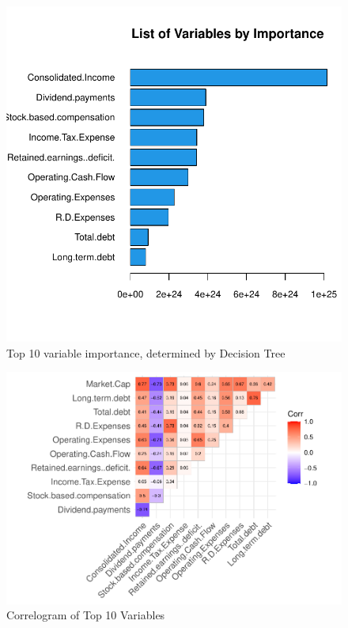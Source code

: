 \documentclass[11pt,]{article}
\begin{document}
\begin{figure}

{\centering \includegraphics{stock_analysis_files/figure-latex/variable importance-1} 

}

\caption{Top 10 variable importance, determined by Decision Tree}\label{fig:variable importance}
\end{figure}

\begin{figure}

{\centering \includegraphics{stock_analysis_files/figure-latex/correlation plot 2-1} 

}

\caption{Correlogram of Top 10 Variables}\label{fig:correlation plot 2}
\end{figure}
\end{document}
